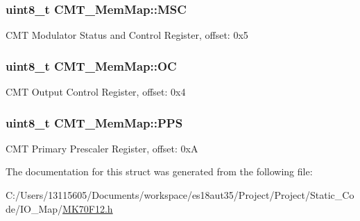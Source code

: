 \subsubsection[{M\+S\+C}]{\setlength{\rightskip}{0pt plus 5cm}uint8\+\_\+t C\+M\+T\+\_\+\+Mem\+Map\+::\+M\+S\+C}\label{struct_c_m_t___mem_map_ad1905c6966e1ac635348ce19d5c44ae9}
C\+M\+T Modulator Status and Control Register, offset\+: 0x5 \hypertarget{struct_c_m_t___mem_map_a67d3243d0c24b20b493fd919433dd84c}{}
\subsubsection[{O\+C}]{\setlength{\rightskip}{0pt plus 5cm}uint8\+\_\+t C\+M\+T\+\_\+\+Mem\+Map\+::\+O\+C}\label{struct_c_m_t___mem_map_a67d3243d0c24b20b493fd919433dd84c}
C\+M\+T Output Control Register, offset\+: 0x4 \hypertarget{struct_c_m_t___mem_map_a3a70b1ee9e4f0c56e0b2f48e059e1590}{}
\subsubsection[{P\+P\+S}]{\setlength{\rightskip}{0pt plus 5cm}uint8\+\_\+t C\+M\+T\+\_\+\+Mem\+Map\+::\+P\+P\+S}\label{struct_c_m_t___mem_map_a3a70b1ee9e4f0c56e0b2f48e059e1590}
C\+M\+T Primary Prescaler Register, offset\+: 0x\+A 

The documentation for this struct was generated from the following file\+:\begin{DoxyCompactItemize}
\item 
C\+:/\+Users/13115605/\+Documents/workspace/es18aut35/\+Project/\+Project/\+Static\+\_\+\+Code/\+I\+O\+\_\+\+Map/\hyperlink{_m_k70_f12_8h}{M\+K70\+F12.\+h}\end{DoxyCompactItemize}
